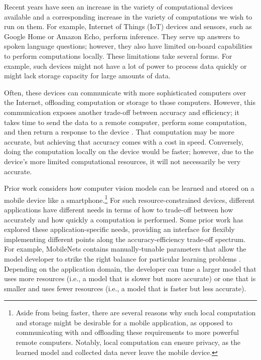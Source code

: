 \documentclass[sigplan,screen]{acmart}
\begin{document}
Recent years have seen an increase in the variety of computational devices available and a corresponding increase in the variety of computations we wish to run on them. For example, Internet of Things (IoT) devices and sensors, such as Google Home or Amazon Echo, perform inference. They serve up answers to spoken language questions; however, they also have limited on-board capabilities to perform computations locally. These limitations take several forms. For example, such devices might not have a lot of power to process data quickly or might lack storage capacity for large amounts of data.

Often, these devices can communicate with more sophisticated computers over the Internet, offloading computation or storage to those computers. However, this communication exposes another trade-off between accuracy and efficiency; it takes time to send the data to a remote computer, perform some computation, and then return a response to the device \cite{birman2019cloud}. That computation may be more accurate, but achieving that accuracy comes with a cost in speed. Conversely, doing the computation locally on the device would be faster; however, due to the device's more limited computational resources, it will not necessarily be very accurate.

Prior work considers how computer vision models can be learned and stored on a mobile device like a smartphone.\footnote{Aside from being faster, there are several reasons why such local computation and storage might be desirable for a mobile application, as opposed to communicating with and offloading these requirements to more powerful remote computers. Notably, local computation can ensure privacy, as the learned model and collected data never leave the mobile device.} For such resource-constrained devices, different applications have different needs in terms of how to trade-off between how accurately and how quickly a computation is performed. Some prior work has explored these application-specific needs, providing an interface for flexibly implementing different points along the accuracy-efficiency trade-off spectrum. For example, MobileNets contains manually-tunable parameters that allow the model developer to strike the right balance for particular learning problems \cite{howard2017mobilenets}. Depending on the application domain, the developer can tune a larger model that uses more resources (i.e., a model that is slower but more accurate) or one that is smaller and uses fewer resources (i.e., a model that is faster but less accurate).
\end{document}
